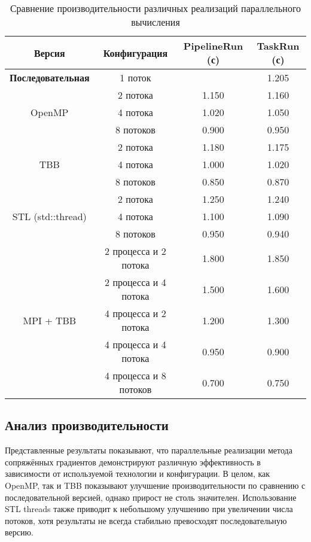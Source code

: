\documentclass[12pt]{article}
\begin{document}
\renewcommand{\arraystretch}{1.4}
\begin{table}[H]
\centering
\footnotesize
\begin{tabular}{|c|c|c|c|}
\hline
\textbf{Версия} & \textbf{Конфигурация} & \textbf{PipelineRun (с)} & \textbf{TaskRun (с)} \\
\hline
\textbf{Последовательная} & 1 поток & \centering 1.200 & 1.205 \\
\hline
\multirow{3}{*}{OpenMP} 
  & 2 потока & 1.150 & 1.160 \\
  & 4 потока & 1.020 & 1.050 \\
  & 8 потоков & 0.900 & 0.950 \\
\hline
\multirow{3}{*}{TBB} 
  & 2 потока & 1.180 & 1.175 \\
  & 4 потока & 1.000 & 1.020 \\
  & 8 потоков & 0.850 & 0.870 \\
\hline
\multirow{3}{*}{STL (std::thread)} 
  & 2 потока & 1.250 & 1.240 \\
  & 4 потока & 1.100 & 1.090 \\
  & 8 потоков & 0.950 & 0.940 \\
\hline
\multirow{5}{*}{MPI + TBB} 
  & 2 процесса и 2 потока & 1.800 & 1.850 \\
  & 2 процесса и 4 потока & 1.500 & 1.600 \\
  & 4 процесса и 2 потока & 1.200 & 1.300 \\
  & 4 процесса и 4 потока & 0.950 & 0.900 \\
  & 4 процесса и 8 потоков & 0.700 & 0.750 \\
\hline
\end{tabular}
\caption{Сравнение производительности различных реализаций параллельного вычисления}
\label{tab:parallel_perf}
\end{table}
\subsection{Анализ производительности}
\hspace*{1.35em}Представленные результаты показывают, что параллельные реализации метода сопряжённых градиентов демонстрируют различную эффективность в зависимости от используемой технологии и конфигурации. В целом, как OpenMP, так и TBB показывают улучшение производительности по сравнению с последовательной версией, однако прирост не столь значителен. Использование STL threads также приводит к небольшому улучшению при увеличении числа потоков, хотя результаты не всегда стабильно превосходят последовательную версию.
\end{document}
